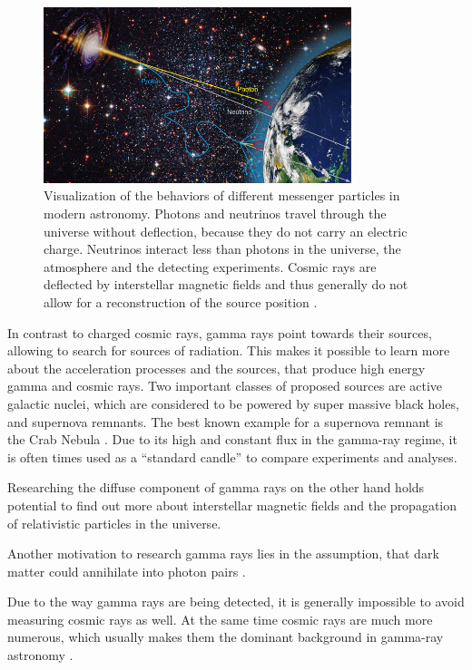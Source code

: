 \begin{figure}
	\centering
	\captionsetup{width=0.9\linewidth}
	\includegraphics[width=0.8\textwidth]{images/astro-web-titel.jpg}
	\caption{Visualization of the behaviors of different messenger
		particles in modern astronomy.
		Photons and neutrinos travel through the universe without deflection,
		because they do not carry an electric charge.
		Neutrinos interact less than photons in the universe, the atmosphere and 
		the detecting experiments.
		Cosmic rays are deflected by interstellar
		magnetic fields and thus generally do not allow for a reconstruction
		of the source position \cite{desy_mm_astro}.
	}
	\label{fig:multi_messenger}
\end{figure}

In contrast to charged cosmic rays, gamma rays point towards
their sources, allowing to search for sources of radiation.
This makes it possible to learn more about the acceleration processes
and the sources, that produce high energy gamma and cosmic rays.
Two important classes of proposed sources are active galactic nuclei,
which are considered to be powered by super massive black holes, and 
supernova remnants. The best known example for a supernova remnant
is the Crab Nebula \cite{1989ApJ...342..379W}.
Due to its high and constant flux in the gamma-ray regime,
it is often times used as a \enquote{standard candle} to compare experiments and
analyses.

Researching the diffuse component of gamma rays on the other hand holds
potential to find out more about interstellar magnetic fields and the
propagation of relativistic particles in the universe.

Another motivation to research gamma rays lies in the assumption, that
dark matter could annihilate into photon pairs \cite{Weniger_2012}.

Due to the way gamma rays are being detected, it is generally impossible
to avoid measuring cosmic rays as well.
At the same time cosmic rays are much more numerous,
which usually makes them the dominant background in gamma-ray 
astronomy \cite{funcray}.

